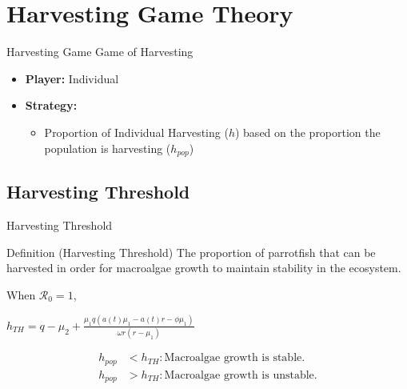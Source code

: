 \documentclass{beamer}
\begin{document}
\section{Harvesting Game Theory}

\begin{frame}{Harvesting Game}
Game of Harvesting 
\begin{itemize}
    \item \textbf{Player:} Individual
    \item \textbf{Strategy: } 
        \begin{itemize}
            \item Proportion of Individual Harvesting ($h$) based on the proportion the population is harvesting ($h_{pop}$)
        \end{itemize}
\end{itemize}
\end{frame}

\subsection{Harvesting Threshold}
\begin{frame}{Harvesting Threshold}
    \begin{block}{Definition (Harvesting Threshold)}
        The proportion of parrotfish that can be harvested in order for macroalgae growth to maintain stability in the ecosystem. 
    \end{block}
    
    \vspace{0.5cm}
    
    When $\mathscr{R}_{0} = 1$,
    \begin{center}
    
    $\displaystyle{h_{TH} = q - \mu_{2} + \frac{\mu_{1}q(a(t) \mu_{1} - a(t)r - \phi \mu_{1})}{\omega r(r-\mu_{1})}}$ \\
    \end{center}
    \begin{align*}
    h_{pop} &< h_{TH}: \text{Macroalgae growth is stable.} \\
    h_{pop} &> h_{TH}: \text{Macroalgae growth is unstable.}
    \end{align*}
\end{frame}
\end{document}
